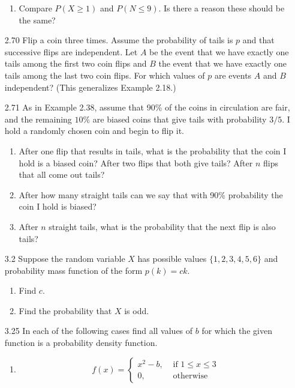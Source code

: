 \documentclass[10pt]{article}
\begin{document}
\begin{itemize}
\begin{enumerate}
      \item Compare $P(X \geq 1)$ and $P(N \leq 9)$. Is there a reason
        these should be the same?
    \end{enumerate}

\newpage
  \item[2.70] Flip a coin three times. Assume the probability of tails is
    $p$ and that successive flips are independent. Let $A$ be the event
    that we have exactly one tails among the first two coin flips and $B$
    the event that we have exactly one tails among the last two coin
    flips. For which values of $p$ are events $A$ and $B$ independent?
    (This generalizes Example 2.18.)

\newpage
  \item[2.71] As in Example 2.38, assume that 90\% of the coins in
    circulation are fair, and the remaining $10 \%$ are biased coins
    that give tails with probability $3 / 5$. I hold a randomly chosen
    coin and begin to flip it.
    \begin{enumerate}
      \item After one flip that results in tails, what is the
        probability that the coin I hold is a biased coin? After two
        flips that both give tails? After $n$ flips that all come out
        tails?

      \item After how many straight tails can we say that with 90\%
        probability the coin I hold is biased?

      \item After $n$ straight tails, what is the probability that the
        next flip is also tails?
    \end{enumerate}

\newpage
  \item[3.2] Suppose the random variable $X$ has possible values
    $\{1,2,3,4,5,6\}$ and probability mass function of the form
    $p(k)=c k$.

    \begin{enumerate}
      \item Find $c$.

      \item Find the probability that $X$ is odd.
    \end{enumerate}


\newpage
  \item[3.25] In each of the following cases find all values of $b$ for
    which the given function is a probability density function.
    \begin{enumerate}
      \item 
        \[ f(x)=
          \begin{cases}
            x^{2}-b, & \text { if } 1 \leq x \leq 3 \\
            0, & \text { otherwise }
          \end{cases}
        \]


\end{enumerate}
\end{itemize}
\end{document}
